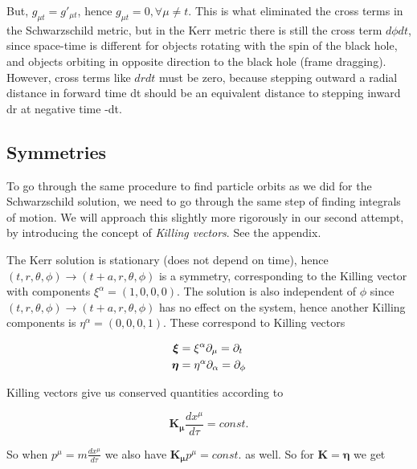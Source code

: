 But, $g_{\mu t} = g'_{\mu t}$, hence $g_{\mu t}=0, \forall \mu \neq t$. This is what eliminated the cross terms in the Schwarzschild metric, but in the Kerr metric there is still the cross term $d\phi dt$, since space-time is different for objects rotating with the spin of the black hole, and objects orbiting in opposite direction to the black hole (frame dragging). However, cross terms like $dr dt$ must be zero, because stepping outward a radial distance in forward time dt should be an equivalent distance to stepping inward dr at negative time -dt. 


\subsection{Symmetries}

To go through the same procedure to find particle orbits as we did for the Schwarzschild solution, we need to go through the same step of finding integrals of motion. We will approach this slightly more rigorously in our second attempt, by introducing the concept of \textit{Killing vectors}. See the appendix.

The Kerr solution is stationary (does not depend on time), hence $(t,r,\theta,\phi)\rightarrow(t+a,r,\theta,\phi)$ is a symmetry, corresponding to the Killing vector with components $\xi^{\alpha}=(1,0,0,0)$. The solution is also independent of $\phi$ since $(t,r,\theta,\phi)\rightarrow(t+a,r,\theta,\phi)$ has no effect on the system, hence another Killing components is $\eta^{\alpha}=(0,0,0,1)$. These correspond to Killing vectors 


\begin{alignat}{2}
    \boldsymbol{\xi}&=\xi^{\alpha}\partial_{\mu}=\partial_t\notag\\
    \boldsymbol{\eta}&=\eta^{\alpha}\partial_{\alpha}=\partial_{\phi}\notag
\end{alignat}

Killing vectors give us conserved quantities according to 

\begin{equation}
    \boldsymbol{K_\mu} \frac{dx^\mu}{d\tau} = const.
\end{equation}

So when $p^\mu=m\frac{dx^\mu}{d\tau}$ we also have $\boldsymbol{K_\mu} p^\mu = const.$ as well. So for $\boldsymbol{K}=\boldsymbol{\eta}$ we get 

